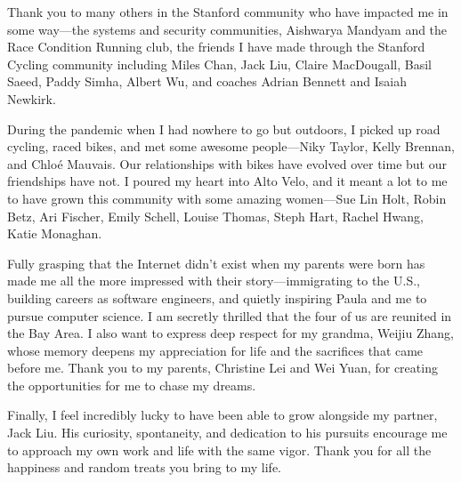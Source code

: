 Thank you to many others in the Stanford community who have impacted me in some
way---the systems and security communities, Aishwarya Mandyam and the Race
Condition Running club, the friends I have made through the Stanford Cycling
community including Miles Chan, Jack Liu, Claire MacDougall, Basil Saeed, Paddy
Simha, Albert Wu, and coaches Adrian Bennett and Isaiah Newkirk.

During the pandemic when I had nowhere to go but outdoors, I picked up road
cycling, raced bikes, and met some awesome people---Niky Taylor, Kelly
Brennan, and Chloé Mauvais. Our relationships with bikes have evolved over time
but our friendships have not. I poured my heart into Alto Velo, and it meant a
lot to me to have grown this community with some amazing women---Sue Lin Holt,
Robin Betz, Ari Fischer, Emily Schell, Louise Thomas, Steph Hart, Rachel Hwang,
Katie Monaghan.

Fully grasping that the Internet didn't exist when my parents were born has made
me all the more impressed with their story---immigrating to the U.S., building
careers as software engineers, and quietly inspiring Paula and me to pursue
computer science. I am secretly thrilled that the four of us are reunited in
the Bay Area. I also want to express deep respect for my grandma, Weijiu Zhang,
whose memory deepens my appreciation for life and the sacrifices that came
before me. Thank you to my parents, Christine Lei and Wei Yuan, for creating
the opportunities for me to chase my dreams.

Finally, I feel incredibly lucky to have been able to grow alongside my partner,
Jack Liu. His curiosity, spontaneity, and dedication to his pursuits encourage
me to approach my own work and life with the same vigor. Thank you for all the
happiness and random treats you bring to my life.
